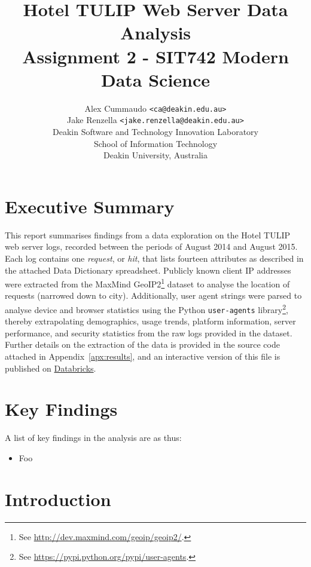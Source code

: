 \documentclass[12pt,titlepage]{article}
\author{Alex Cummaudo \texttt{<ca@deakin.edu.au>}\\ Jake Renzella \texttt{<jake.renzella@deakin.edu.au>}\\
Deakin Software and Technology Innovation Laboratory\\School of Information Technology\\Deakin University, Australia}
\title{Hotel TULIP Web Server Data Analysis\\\normalsize{\bfseries Assignment 2 - SIT742 Modern Data Science}}
\begin{document}
\maketitle

\section*{Executive Summary}

This report summarises findings from a data exploration on the Hotel TULIP web server logs, recorded between the periods of August 2014 and August 2015. Each log contains one \textit{request}, or \textit{hit}, that lists fourteen attributes as described in the attached Data Dictionary spreadsheet. Publicly known client IP addresses were extracted from the MaxMind GeoIP2\footnote{See \url{http://dev.maxmind.com/geoip/geoip2/}.} dataset to analyse the location of requests (narrowed down to city). Additionally, user agent strings were parsed to analyse device and browser statistics using the Python \texttt{user-agents} library\footnote{See \url{https://pypi.python.org/pypi/user-agents}.}, thereby extrapolating demographics, usage trends, platform information, server performance, and security statistics from the raw logs provided in the dataset. Further details on the extraction of the data is provided in the source code attached in Appendix~\ref{apx:results}, and an interactive version of this file is published on \href{https://databricks-prod-cloudfront.cloud.databricks.com/public/4027ec902e239c93eaaa8714f173bcfc/7364378259770565/3552971541306612/8155742302574378/latest.html}{Databricks}.

\newpage

\tableofcontents\newpage
\listoffigures\newpage

\newpage
\section{Key Findings}

A list of key findings in the analysis are as thus:

\begin{itemize}
  \item Foo
\end{itemize}

\newpage
\section{Introduction}
\end{document}
